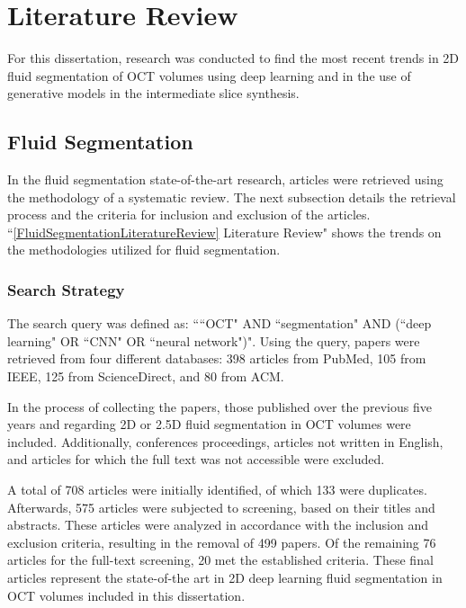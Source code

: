 \chapter{Literature Review}\label{LiteratureReview}
For this dissertation, research was conducted to find the most recent trends in 2D fluid segmentation of OCT volumes using deep learning and in the use of generative models in the intermediate slice synthesis.
\section{Fluid Segmentation}
In the fluid segmentation state-of-the-art research, articles were retrieved using the methodology of a systematic review. The next subsection details the retrieval process and the criteria for inclusion and exclusion of the articles. ``\ref{FluidSegmentationLiteratureReview} Literature Review" shows the trends on the methodologies utilized for fluid segmentation.
\subsection{Search Strategy}\label{SearchStrategy}
The search query was defined as: ````OCT" AND ``segmentation" AND (``deep learning" OR ``CNN" OR ``neural network")". Using the query, papers were retrieved from four different databases: 398 articles from PubMed, 105 from IEEE, 125 from ScienceDirect, and 80 from ACM.
\par
In the process of collecting the papers, those published over the previous five years and regarding 2D or 2.5D fluid segmentation in OCT volumes were included. Additionally, conferences proceedings, articles not written in English, and articles for which the full text was not accessible were excluded.
\par
A total of 708 articles were initially identified, of which 133 were duplicates. Afterwards, 575 articles were subjected to screening, based on their titles and abstracts. These articles were analyzed in accordance with the inclusion and exclusion criteria, resulting in the removal of 499 papers. Of the remaining 76 articles for the full-text screening, 20 met the established criteria. These final articles represent the state-of-the art in 2D deep learning fluid segmentation in OCT volumes included in this dissertation.

